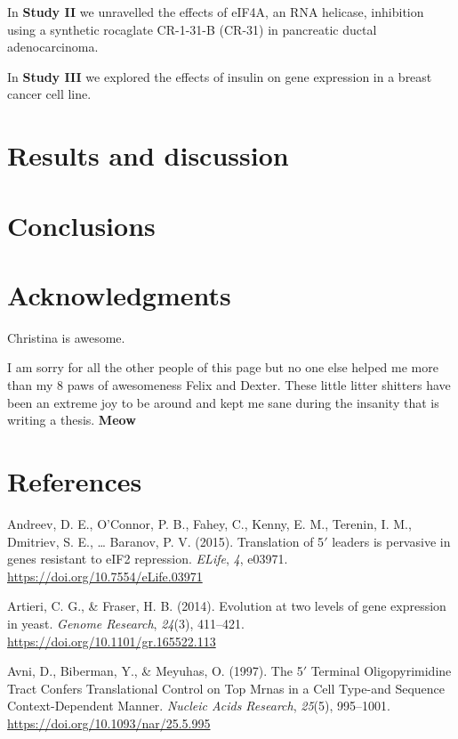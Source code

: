 \documentclass[12pt,openany]{book}
\begin{document}
In \textbf{Study II} we unravelled the effects of eIF4A, an RNA
helicase, inhibition using a synthetic rocaglate CR-1-31-B (CR-31) in
pancreatic ductal adenocarcinoma.

In \textbf{Study III} we explored the effects of insulin on gene
expression in a breast cancer cell line.

\chapter{Results and discussion}

\chapter{Conclusions}

\chapter*{Acknowledgments}\label{acknowledgments}

Christina is awesome.

I am sorry for all the other people of this page but no one else helped
me more than my 8 paws of awesomeness Felix and Dexter. These little
litter shitters have been an extreme joy to be around and kept me sane
during the insanity that is writing a thesis. \textbf{Meow}

\chapter*{References}\label{references}

\hypertarget{refs}{}
\hypertarget{ref-Andreev2015}{}
Andreev, D. E., O'Connor, P. B., Fahey, C., Kenny, E. M., Terenin, I.
M., Dmitriev, S. E., \ldots{} Baranov, P. V. (2015). Translation of
5\({'}\) leaders is pervasive in genes resistant to eIF2 repression.
\emph{ELife}, \emph{4}, e03971.
\url{https://doi.org/10.7554/eLife.03971}

\hypertarget{ref-Artieri2014}{}
Artieri, C. G., \& Fraser, H. B. (2014). Evolution at two levels of gene
expression in yeast. \emph{Genome Research}, \emph{24}(3), 411--421.
\url{https://doi.org/10.1101/gr.165522.113}

\hypertarget{ref-Avni1997}{}
Avni, D., Biberman, Y., \& Meyuhas, O. (1997). The 5\({'}\) Terminal
Oligopyrimidine Tract Confers Translational Control on Top Mrnas in a
Cell Type-and Sequence Context-Dependent Manner. \emph{Nucleic Acids
Research}, \emph{25}(5), 995--1001.
\url{https://doi.org/10.1093/nar/25.5.995}
\end{document}
